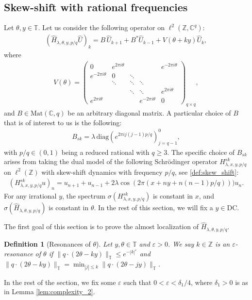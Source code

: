 \documentclass[11pt]{amsart}
\newtheorem{definition}{Definition}[section]
\newcommand{\Z}{\mathbb Z}
\newcommand{\C}{\mathbb C}
\newcommand{\T}{\mathbb T}
\begin{document}
\subsection{Skew-shift with rational frequencies}
Let $\theta,y\in \T$.
Let us consider the following operator on $\ell^2(\Z, \C^q)$:
\begin{align}\label{def:hatH_sk}
    (\widehat{H}_{\lambda,\theta,y,p/q}\hat{U})_k=B\, \hat{U}_{k+1}+B^* \hat{U}_{k-1}+V(\theta+ky)\hat{U}_{k},
\end{align}
where
\begin{align}\label{eq:V_sk}
    V(\theta)=
    \left(\begin{matrix}
        0 & e^{2\pi i \theta} & & &e^{-2\pi i\theta}\\
        e^{-2\pi i\theta} &0 &\ddots & &\\
        &\ddots &\ddots &\ddots &\\
        & &\ddots &\ddots &e^{2\pi i\theta}\\
        e^{2\pi i\theta}& & &e^{-2\pi i\theta} &0
    \end{matrix}\right)_{q\times q},
\end{align} 
and $B\in \mathrm{Mat}(\C, q)$ be an arbitrary diagonal matrix. A particular choice of $B$ that is of interest to us is the following:
\begin{align}\label{def:Bsk}
    B_{sk}=\lambda\, \mathrm{diag}(e^{2\pi i j(j-1)p/q})_{j=q-1}^0,
\end{align}
with $p/q\in (0,1)$ being a reduced rational with $q\geq 3$. 
The specific choice of $B_{sk}$ arises from taking the dual model of the following Schr\"odinger operator $H^{sk}_{\lambda,x,y,p/q}$ on $\ell^2(\Z)$ with skew-shift dynamics with frequency $p/q$, see \eqref{def:skew_shift}:
\begin{align}
    (H^{sk}_{\lambda,x,y,p/q}u)_n=u_{n+1}+u_{n-1}+2\lambda\cos(2\pi(x+ny+n(n-1)p/q)))u_n.
\end{align}
For any irrational $y$, the spectrum $\sigma(H^{sk}_{\lambda,x,y,p/q})$ is constant in $x$, and $\sigma(\widehat{H}_{\lambda,\theta,y,p/q})$ is constant in $\theta$.
In the rest of this section, we will fix a $y\in \mathrm{DC}$.

The first goal of this section is to prove the almost localization of $\widehat{H}_{\lambda,\theta,y,p/q}$.
\begin{definition}[Resonances of $\theta$]
Let $y,\theta\in \T$ and $\varepsilon>0$. We say $k\in \Z$ is an $\varepsilon$-resonance of $\theta$ if $\|q\cdot (2\theta-ky)\|_{\T}\leq e^{-|k|^{\varepsilon}}$ and $\|q\cdot (2\theta-ky)\|_{\T}=\min_{|j|\leq k} \|q\cdot (2\theta-jy)\|_{\T}$.
\end{definition}
In the rest of the section, we fix some $\varepsilon$ such that $0<\varepsilon<\delta_1/4$, where $\delta_1>0$ is as in Lemma \ref{lem:complexity_2}. 
\end{document}
